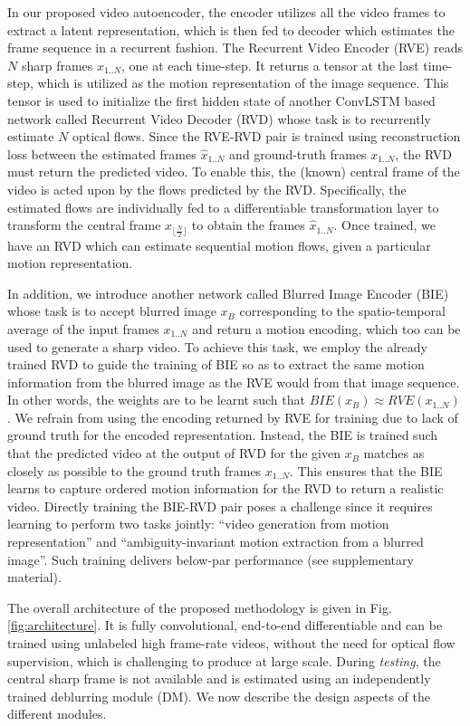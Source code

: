 \documentclass[10pt,twocolumn,letterpaper]{article}
\begin{document}
In our proposed video autoencoder, the encoder utilizes all the video frames to extract a latent representation, which is then fed to decoder which estimates the frame sequence in a recurrent fashion. The Recurrent Video Encoder (RVE) reads $N$ sharp frames ${x}_{1..N}$, one at each time-step. It returns a tensor at the last time-step, which is utilized as the motion representation of the image sequence. This tensor is used to initialize the first hidden state of another ConvLSTM based network called Recurrent Video Decoder (RVD) whose task is to recurrently estimate $N$ optical flows. Since the RVE-RVD pair is trained using reconstruction loss between the estimated frames $\hat{x}_{1..N}$ and ground-truth frames ${x}_{1..N}$, the RVD must return the predicted video. To enable this, the (known) central frame of the video is acted upon by the flows predicted by the RVD. Specifically, the estimated flows are individually fed to a differentiable transformation layer to transform the central frame $x_{\lfloor\frac{N}{2}\rfloor}$ to obtain the frames $\hat{x}_{1..N}$. Once trained, we have an RVD which can estimate sequential motion flows, given a particular motion representation.

In addition, we introduce another network called Blurred Image Encoder (BIE) whose task is to accept blurred image $x_B$ corresponding to the spatio-temporal average of the input frames ${x}_{1..N}$ and return a motion encoding, which too can be used to generate a sharp video.  
To achieve this task, we employ the already trained RVD to guide the training of BIE so as to extract the same motion information from the blurred image as the RVE would from that image sequence. In other words, the weights are to be learnt such that $BIE(x_B) \approx RVE(x_{1..N})$. We refrain from using the encoding returned by RVE for training due to lack of ground truth for the encoded representation. Instead, the BIE is trained such that the predicted video at the output of RVD for the given $x_B$ matches as closely as possible to the ground truth frames ${x}_{1..N}$. This ensures that the BIE learns to capture ordered motion information for the RVD to return a realistic video. Directly training the BIE-RVD pair poses a challenge since it requires learning to perform two tasks jointly: ``video generation from motion representation'' and ``ambiguity-invariant motion extraction from a blurred image''. Such training delivers below-par performance (see supplementary material).


The overall architecture of the proposed methodology is given in Fig. \ref{fig:architecture}. It is fully convolutional, end-to-end differentiable and can be trained using unlabeled high frame-rate videos, without the need for optical flow supervision, which is challenging to produce at large scale. During \emph{testing}, the central sharp frame is not available and is estimated using an independently trained deblurring module (DM). We now describe the design aspects of the different modules.
\end{document}
